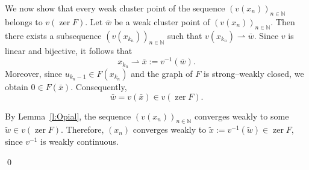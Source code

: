\documentclass[11pt]{article}
\makeatletter
\renewenvironment{proof}[1][\proofname]{\par
	\normalfont
	\topsep0\p@\@plus3\p@ \trivlist
	\item[\hskip\labelsep\itshape
	#1\@addpunct{.}]\ignorespaces
}{%
	\qed\endtrivlist
}
\theoremstyle{definition}
\theoremstyle{definition}
\theoremstyle{definition}
\newcommand{\zer}{\ensuremath{\operatorname{zer}}}
\newcommand{\gra}{\ensuremath{\operatorname{gra}}}
\newcommand{\Fix}{\ensuremath{\operatorname{Fix}}}
\newcommand{\tcr}{\textcolor{red}}
\def\tcr{ \textcolor{red}}
\makeatother
\begin{document}
\begin{proof}
%
%
\medskip

We now show that every weak cluster point of the sequence
\((v(x_n))_{n\in\mathbb{N}}\) belongs to \(v(\zer F)\).
Let \(\bar{w}\) be a weak cluster point of \((v(x_n))_{n\in\mathbb{N}}\).
Then there exists a subsequence \((v(x_{k_n}))_{n\in\mathbb{N}}\) such that
\(v(x_{k_n}) \rightharpoonup \bar{w}\).
Since \(v\) is linear and bijective, it follows that
\[
x_{k_n} \rightharpoonup \bar{x} := v^{-1}(\bar{w}).
\]
Moreover, since \(u_{k_n-1} \in F(x_{k_n})\) and the graph of \(F\) is
strong--weakly closed, we obtain \(0 \in F(\bar{x})\).
Consequently,
\[
\bar{w} = v(\bar{x}) \in v(\zer F).
\]

By Lemma~\ref{l:Opial}, the sequence \((v(x_n))_{n\in\mathbb{N}}\) converges
weakly to some \(\tilde{w} \in v(\zer F)\).
Therefore, \((x_n)\) converges weakly to
\(\tilde{x} := v^{-1}(\tilde{w}) \in \zer F\), since \(v^{-1}\) is weakly
continuous.


\end{proof}
\end{document}
